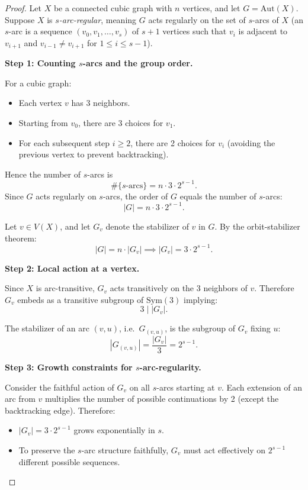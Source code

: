 \documentclass[12pt,a4paper,openany]{book}
\begin{document}
\begin{proof}
Let $X$ be a connected cubic graph with $n$ vertices, and let $G = \mathrm{Aut}(X)$. Suppose $X$ is \emph{$s$-arc-regular}, meaning $G$ acts regularly on the set of $s$-arcs of $X$ (an $s$-arc is a sequence $(v_0,v_1,\dots,v_s)$ of $s+1$ vertices such that $v_i$ is adjacent to $v_{i+1}$ and $v_{i-1}\ne v_{i+1}$ for $1\le i\le s-1$).  

\medskip
\textbf{Step 1: Counting $s$-arcs and the group order.}  

For a cubic graph:
\begin{itemize}
    \item Each vertex $v$ has 3 neighbors.
    \item Starting from $v_0$, there are 3 choices for $v_1$.
    \item For each subsequent step $i\ge 2$, there are 2 choices for $v_i$ (avoiding the previous vertex to prevent backtracking).
\end{itemize}
Hence the number of $s$-arcs is
\[
\#\{\text{$s$-arcs}\} = n \cdot 3 \cdot 2^{s-1}.
\]
Since $G$ acts regularly on $s$-arcs, the order of $G$ equals the number of $s$-arcs:
\[
|G| = n \cdot 3 \cdot 2^{s-1}.
\]

Let $v\in V(X)$, and let $G_v$ denote the stabilizer of $v$ in $G$. By the orbit-stabilizer theorem:
\[
|G| = n \cdot |G_v| \implies |G_v| = 3 \cdot 2^{s-1}.
\]

\medskip
\textbf{Step 2: Local action at a vertex.}  

Since $X$ is arc-transitive, $G_v$ acts transitively on the 3 neighbors of $v$. Therefore $G_v$ embeds as a transitive subgroup of $\mathrm{Sym}(3)$
implying:
\[
3 \mid |G_v|.
\]

The stabilizer of an arc $(v,u)$, i.e.\ $G_{(v,u)}$, is the subgroup of $G_v$ fixing $u$:
\[
|G_{(v,u)}| = \frac{|G_v|}{3} = 2^{s-1}.
\]

\medskip
\textbf{Step 3: Growth constraints for $s$-arc-regularity.}  

Consider the faithful action of $G_v$ on all $s$-arcs starting at $v$. Each extension of an arc from $v$ multiplies the number of possible continuations by 2 (except the backtracking edge). Therefore:
\begin{itemize}
    \item $|G_v| = 3\cdot 2^{s-1}$ grows exponentially in $s$.
    \item To preserve the $s$-arc structure faithfully, $G_v$ must act effectively on $2^{s-1}$ different possible sequences.
\end{itemize}


\end{proof}
\end{document}
